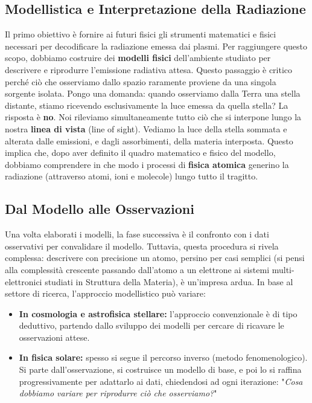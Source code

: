     \subsection{Modellistica e Interpretazione della Radiazione}
    Il primo obiettivo è fornire ai futuri fisici gli strumenti matematici e fisici necessari per decodificare la radiazione emessa dai plasmi. Per raggiungere questo scopo, dobbiamo costruire dei \textbf{modelli fisici} dell'ambiente studiato per descrivere e riprodurre l'emissione radiativa attesa. Questo passaggio è critico perché ciò che osserviamo dallo spazio raramente proviene da una singola sorgente isolata. Pongo una domanda: quando osserviamo dalla Terra una stella distante, stiamo ricevendo esclusivamente la luce emessa da quella stella? La risposta è \textbf{no}. Noi rileviamo simultaneamente tutto ciò che si interpone lungo la nostra \textbf{linea di vista} (line of sight). Vediamo la luce della stella sommata e alterata dalle emissioni, e dagli assorbimenti, della materia interposta. Questo implica che, dopo aver definito il quadro matematico e fisico del modello, dobbiamo comprendere in che modo i processi di \textbf{fisica atomica} generino la radiazione (attraverso atomi, ioni e molecole) lungo tutto il tragitto.
    
    \subsection{Dal Modello alle Osservazioni}
    Una volta elaborati i modelli, la fase successiva è il confronto con i dati osservativi per convalidare il modello. Tuttavia, questa procedura si rivela complessa: descrivere con precisione un atomo, persino per casi semplici (si pensi alla complessità crescente passando dall'atomo a un elettrone ai sistemi multi-elettronici studiati in Struttura della Materia), è un'impresa ardua. In base al settore di ricerca, l'approccio modellistico può variare:\begin{itemize}\item \textbf{In cosmologia e astrofisica stellare:} l'approccio convenzionale è di tipo deduttivo, partendo dallo sviluppo dei modelli per cercare di ricavare le osservazioni attese.\item \textbf{In fisica solare:} spesso si segue il percorso inverso (metodo fenomenologico). Si parte dall'osservazione, si costruisce un modello di base, e poi lo si raffina progressivamente per adattarlo ai dati, chiedendosi ad ogni iterazione: "\textit{Cosa dobbiamo variare per riprodurre ciò che osserviamo?}"\end{itemize}
    
